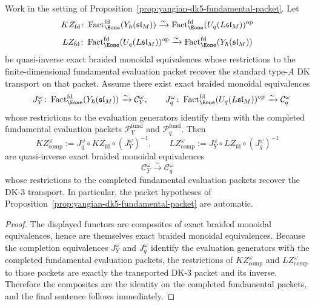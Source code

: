 \begin{proposition}
\label{prop:yangian-dk5-core-realization}
Work in the setting of
Proposition~\ref{prop:yangian-dk5-fundamental-packet}. Let
\[
KZ_{\mathrm{fd}}\colon
\operatorname{Fact}_{\Eone}^{\mathrm{fd}}(Y_\hbar(\mathfrak{sl}_M))
\xrightarrow{\sim}
\operatorname{Fact}_{\Eone}^{\mathrm{fd}}(U_q(L\mathfrak{sl}_M))^{\mathrm{op}}
\]
\[
LZ_{\mathrm{fd}}\colon
\operatorname{Fact}_{\Eone}^{\mathrm{fd}}(U_q(L\mathfrak{sl}_M))^{\mathrm{op}}
\xrightarrow{\sim}
\operatorname{Fact}_{\Eone}^{\mathrm{fd}}(Y_\hbar(\mathfrak{sl}_M))
\]
be quasi-inverse exact braided monoidal equivalences whose restrictions
to the finite-dimensional fundamental evaluation packet recover the
standard type-$A$ DK transport on that packet. Assume there exist exact braided
monoidal equivalences
\[
\quad
J_Y^\omega\colon
\operatorname{Fact}_{\Eone}^{\mathrm{fd}}(Y_\hbar(\mathfrak{sl}_M))
\xrightarrow{\sim}
\mathcal{C}_Y^\omega,
\qquad
J_q^\omega\colon
\operatorname{Fact}_{\Eone}^{\mathrm{fd}}(U_q(L\mathfrak{sl}_M))^{\mathrm{op}}
\xrightarrow{\sim}
\mathcal{C}_q^\omega
\]
whose restrictions to the evaluation generators identify them with the
completed fundamental evaluation packets
$\mathcal{P}^{\mathrm{fund}}_{Y}$ and
$\mathcal{P}^{\mathrm{fund}}_{q}$.
Then
\[
KZ^\omega_{\mathrm{comp}}
:=
J_q^\omega \circ KZ_{\mathrm{fd}} \circ (J_Y^\omega)^{-1},
\qquad
LZ^\omega_{\mathrm{comp}}
:=
J_Y^\omega \circ LZ_{\mathrm{fd}} \circ (J_q^\omega)^{-1}
\]
are quasi-inverse exact braided monoidal equivalences
\[
\mathcal{C}_Y^\omega \xrightarrow{\sim} \mathcal{C}_q^\omega
\]
whose restrictions to the completed fundamental evaluation packets
recover the DK-3 transport. In particular, the packet hypotheses of
Proposition~\ref{prop:yangian-dk5-fundamental-packet} are automatic.
\end{proposition}

\begin{proof}
The displayed functors are composites of exact braided monoidal
equivalences, hence are themselves exact braided monoidal
equivalences. Because the completion equivalences
$J_Y^\omega$ and $J_q^\omega$ identify the evaluation generators with
the completed fundamental evaluation packets, the restrictions of
$KZ^\omega_{\mathrm{comp}}$ and $LZ^\omega_{\mathrm{comp}}$ to those
packets are exactly the transported DK-3 packet and its inverse. Therefore the
composites are the identity on the completed fundamental packets, and
the final sentence follows immediately.
\end{proof}

